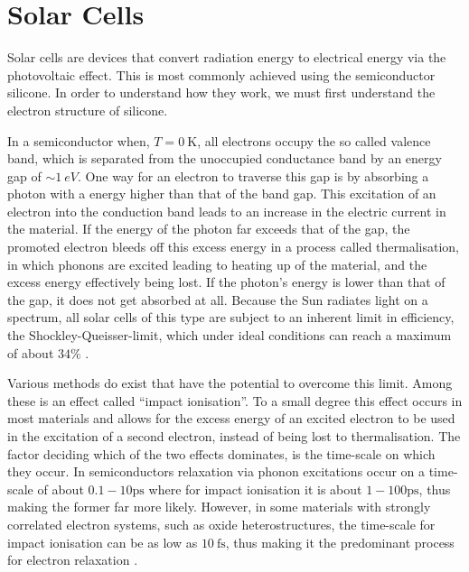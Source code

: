 \section{Solar Cells}

Solar cells are devices that convert radiation energy to electrical energy via the photovoltaic effect. This is most commonly achieved using the semiconductor silicone. In order to understand how they work, we must first understand the electron structure of silicone.

\medskip

In a semiconductor when, $T=\SI{0}{\kelvin}$, all electrons occupy the so called valence band, which is separated from the unoccupied conductance band by an energy gap of $\sim \SI{1}{eV}$. One way for an electron to traverse this gap is by absorbing a photon with a energy higher than that of the band gap. This excitation of an electron into the conduction band leads to an increase in the electric current in the material. If the energy of the photon far exceeds that of the gap, the promoted electron bleeds off this excess energy in a process called thermalisation, in which phonons are excited leading to heating up of the material, and the excess energy effectively being lost. If the photon's energy is lower than that of the gap, it does not get absorbed at all. Because the Sun radiates light on a spectrum, all solar cells  of this type are subject to an inherent limit in efficiency, the Shockley-Queisser-limit, which under ideal conditions can reach a maximum of about $34\%$ \cite{shockley_queisser}.

\medskip

Various methods do exist that have the potential to overcome this limit. Among these is an effect called ``impact ionisation''. To a small degree this effect occurs in most materials and allows for the excess energy of an excited electron to be used in the excitation of a second electron, instead of being lost to thermalisation. The factor deciding which of the two effects dominates, is the time-scale on which they occur. In semiconductors relaxation via phonon excitations occur on a time-scale of about $0.1 - 10 \si{\pico\second}$ where for impact ionisation it is about $1-100\si{\pico\second}$, thus making the former far more likely. However, in some materials with strongly correlated electron systems, such as oxide heterostructures, the time-scale for impact ionisation can be as low as $\SI{10}{\femto\second}$, thus making it the predominant process for electron relaxation \cite{time_scales}.



